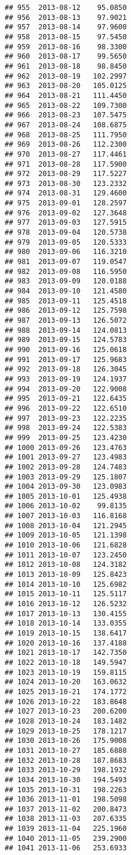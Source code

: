 \documentclass[
]{article}
\begin{document}
\begin{verbatim}
## 955  2013-08-12    95.0850
## 956  2013-08-13    97.9021
## 957  2013-08-14    97.9600
## 958  2013-08-15    97.5450
## 959  2013-08-16    98.3300
## 960  2013-08-17    99.5650
## 961  2013-08-18    98.8450
## 962  2013-08-19   102.2997
## 963  2013-08-20   105.0125
## 964  2013-08-21   111.4450
## 965  2013-08-22   109.7300
## 966  2013-08-23   107.5475
## 967  2013-08-24   108.6875
## 968  2013-08-25   111.7950
## 969  2013-08-26   112.2300
## 970  2013-08-27   117.4461
## 971  2013-08-28   117.5900
## 972  2013-08-29   117.5227
## 973  2013-08-30   123.2332
## 974  2013-08-31   129.4600
## 975  2013-09-01   128.2597
## 976  2013-09-02   127.3648
## 977  2013-09-03   127.5915
## 978  2013-09-04   120.5738
## 979  2013-09-05   120.5333
## 980  2013-09-06   116.3210
## 981  2013-09-07   119.0547
## 982  2013-09-08   116.5950
## 983  2013-09-09   120.0188
## 984  2013-09-10   121.4580
## 985  2013-09-11   125.4518
## 986  2013-09-12   125.7598
## 987  2013-09-13   126.5072
## 988  2013-09-14   124.0813
## 989  2013-09-15   124.5783
## 990  2013-09-16   125.0618
## 991  2013-09-17   125.9683
## 992  2013-09-18   126.3045
## 993  2013-09-19   124.1937
## 994  2013-09-20   122.9008
## 995  2013-09-21   122.6435
## 996  2013-09-22   122.6510
## 997  2013-09-23   122.2235
## 998  2013-09-24   122.5383
## 999  2013-09-25   123.4230
## 1000 2013-09-26   123.4763
## 1001 2013-09-27   123.4983
## 1002 2013-09-28   124.7483
## 1003 2013-09-29   125.1807
## 1004 2013-09-30   123.0983
## 1005 2013-10-01   125.4938
## 1006 2013-10-02    99.8135
## 1007 2013-10-03   116.8168
## 1008 2013-10-04   121.2945
## 1009 2013-10-05   121.1398
## 1010 2013-10-06   121.6828
## 1011 2013-10-07   123.2450
## 1012 2013-10-08   124.3182
## 1013 2013-10-09   125.8423
## 1014 2013-10-10   125.6982
## 1015 2013-10-11   125.5117
## 1016 2013-10-12   126.5232
## 1017 2013-10-13   130.4155
## 1018 2013-10-14   133.0355
## 1019 2013-10-15   138.6417
## 1020 2013-10-16   137.4188
## 1021 2013-10-17   142.7350
## 1022 2013-10-18   149.5947
## 1023 2013-10-19   159.8115
## 1024 2013-10-20   163.0632
## 1025 2013-10-21   174.1772
## 1026 2013-10-22   183.8648
## 1027 2013-10-23   200.6200
## 1028 2013-10-24   183.1482
## 1029 2013-10-25   178.1217
## 1030 2013-10-26   175.9008
## 1031 2013-10-27   185.6888
## 1032 2013-10-28   187.8683
## 1033 2013-10-29   198.1932
## 1034 2013-10-30   194.5493
## 1035 2013-10-31   198.2263
## 1036 2013-11-01   198.5098
## 1037 2013-11-02   200.8473
## 1038 2013-11-03   207.6335
## 1039 2013-11-04   225.1960
## 1040 2013-11-05   239.2900
## 1041 2013-11-06   253.6933

\end{verbatim}
\end{document}
